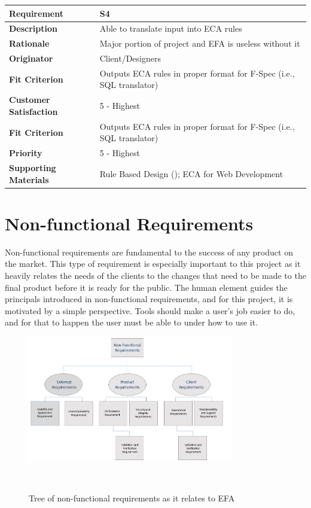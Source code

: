 \documentclass[12pt]{report}
\begin{document}
{\setlength{\tabcolsep}{12pt} %
\begin{tabularx}{\textwidth}{>{\bfseries}m{3cm}X}
Requirement & S4 \\ 
\midrule
\endhead
	Description  & Able to translate input into ECA rules 
	\\	Rationale & Major portion of project and EFA is useless without it
	\\	Originator & Client/Designers 

	\\	Fit Criterion & Outputs ECA rules in proper format for F-Spec (i.e., 
	SQL translator)
	\\	Customer Satisfaction & 5 - Highest 
	\\	Fit Criterion & Outputs ECA rules in proper format for F-Spec (i.e., 
	SQL translator) 
	\\	Priority & 5 - Highest 
	\\	Supporting Materials & Rule Based Design (\cite{RBD}); ECA for Web Development %
\vspace{12pt}
\end{tabularx}
}


\chapter{Non-functional Requirements}\label{ch:NonFunc}
Non-functional requirements are fundamental to the success of any product on the market. This type 
of requirement is especially important to this project as it heavily relates the needs of the 
clients to the changes that need to be made to the final product before it is ready for the public. 
The human element guides the principals introduced in non-functional requirements, and for this 
project, it is motivated by a simple perspective. Tools should make a user’s job easier to do, and 
for that to happen the user must be able to under how to use it. 

\begin{figure}[!htb]
	\centering
	\includegraphics[width=0.8\textwidth]{../figures/NONFUNCTIONAL}
	\caption{Tree of non-functional requirements as it relates to EFA}~\label{fig:figure2}
\end{figure}
\end{document}
